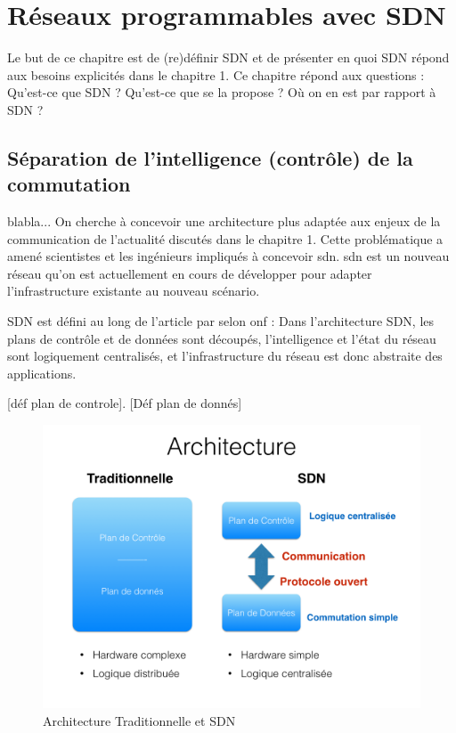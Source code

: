\chapter{Réseaux programmables avec SDN}

Le but de ce chapitre est de (re)définir SDN et de présenter en quoi SDN répond aux besoins explicités dans le chapitre 1.
Ce chapitre répond aux questions : Qu'est-ce que SDN ? Qu'est-ce que se la propose ? Où on en est par rapport à SDN ?

\section{Séparation de l'intelligence (contrôle) de la commutation}

blabla...
On cherche à concevoir une architecture plus adaptée aux enjeux de la communication de l'actualité discutés dans le chapitre 1. Cette problématique a amené scientistes et les ingénieurs impliqués à concevoir \gls{sdn}. \gls{sdn} est un nouveau  réseau qu'on est actuellement en cours de développer pour adapter l'infrastructure existante au nouveau scénario.



SDN est défini au long de l'article par  selon \gls{onf} \cite{SDNNewNormONFExecutiveSummary} : Dans l'architecture SDN, les plans de contrôle et de données sont découpés, l'intelligence et l'état du réseau sont logiquement centralisés, et l'infrastructure du réseau est donc abstraite des applications. 

[déf plan de controle]. [Déf plan de donnés]


\begin{figure}[!h] %
\includegraphics[width=15cm]{images/ComparaisonArchis.png} %
\caption{ Architecture Traditionnelle et SDN} %
\label{image_soleil} %
\end{figure} %

